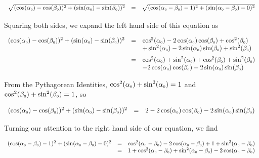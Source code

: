 \[ \begin{array}{rcl}

\sqrt{(\cos(\alpha_{\mbox{\tiny $0$}}) - \cos(\beta_{\mbox{\tiny $0$}}))^2 + (\sin(\alpha_{\mbox{\tiny $0$}}) - \sin(\beta_{\mbox{\tiny $0$}}))^2 } & = & \sqrt{(\cos(\alpha_{\mbox{\tiny $0$}} - \beta_{\mbox{\tiny $0$}}) - 1)^2 + (\sin(\alpha_{\mbox{\tiny $0$}} - \beta_{\mbox{\tiny $0$}}) - 0)^2} \\ \end{array} \]

Squaring both sides, we expand the left hand side of this equation as

\[ \begin{array}{rcl}
(\cos(\alpha_{\mbox{\tiny $0$}}) - \cos(\beta_{\mbox{\tiny $0$}}))^2 + (\sin(\alpha_{\mbox{\tiny $0$}}) - \sin(\beta_{\mbox{\tiny $0$}}))^2 
& = &  
\cos^2(\alpha_{\mbox{\tiny $0$}}) - 2\cos(\alpha_{\mbox{\tiny $0$}})\cos(\beta_{\mbox{\tiny $0$}}) + \cos^2(\beta_{\mbox{\tiny $0$}}) \\  
& & + \sin^2(\alpha_{\mbox{\tiny $0$}}) - 2\sin(\alpha_{\mbox{\tiny $0$}})\sin(\beta_{\mbox{\tiny $0$}})  +  \sin^2(\beta_{\mbox{\tiny $0$}}) \\ [6pt]
& = & \cos^2(\alpha_{\mbox{\tiny $0$}}) + \sin^2(\alpha_{\mbox{\tiny $0$}}) + \cos^2(\beta_{\mbox{\tiny $0$}}) + \sin^2(\beta_{\mbox{\tiny $0$}}) \\
& & -  2\cos(\alpha_{\mbox{\tiny $0$}})\cos(\beta_{\mbox{\tiny $0$}}) - 2\sin(\alpha_{\mbox{\tiny $0$}})\sin(\beta_{\mbox{\tiny $0$}}) \end{array}\]

From the Pythagorean Identities, $\cos^2(\alpha_{\mbox{\tiny $0$}}) + \sin^2(\alpha_{\mbox{\tiny $0$}}) = 1$ and $\cos^2(\beta_{\mbox{\tiny $0$}}) + \sin^2(\beta_{\mbox{\tiny $0$}}) = 1$, so

\[ \begin{array}{rcl}
(\cos(\alpha_{\mbox{\tiny $0$}}) - \cos(\beta_{\mbox{\tiny $0$}}))^2 + (\sin(\alpha_{\mbox{\tiny $0$}}) - \sin(\beta_{\mbox{\tiny $0$}}))^2 
& = & 2  - 2\cos(\alpha_{\mbox{\tiny $0$}})\cos(\beta_{\mbox{\tiny $0$}}) - 2\sin(\alpha_{\mbox{\tiny $0$}})\sin(\beta_{\mbox{\tiny $0$}}) \end{array}\]

Turning our attention to the right hand side of our equation, we find

\[ \begin{array}{rcl}
(\cos(\alpha_{\mbox{\tiny $0$}} - \beta_{\mbox{\tiny $0$}}) - 1)^2 + (\sin(\alpha_{\mbox{\tiny $0$}} - \beta_{\mbox{\tiny $0$}}) - 0)^2 & = & \cos^2(\alpha_{\mbox{\tiny $0$}} - \beta_{\mbox{\tiny $0$}}) - 2\cos(\alpha_{\mbox{\tiny $0$}} - \beta_{\mbox{\tiny $0$}}) + 1 + \sin^2(\alpha_{\mbox{\tiny $0$}} - \beta_{\mbox{\tiny $0$}}) \\ 
& = & 1 +  \cos^2(\alpha_{\mbox{\tiny $0$}} - \beta_{\mbox{\tiny $0$}}) + \sin^2(\alpha_{\mbox{\tiny $0$}} - \beta_{\mbox{\tiny $0$}}) - 2\cos(\alpha_{\mbox{\tiny $0$}} - \beta_{\mbox{\tiny $0$}}) \\
\end{array} \]

